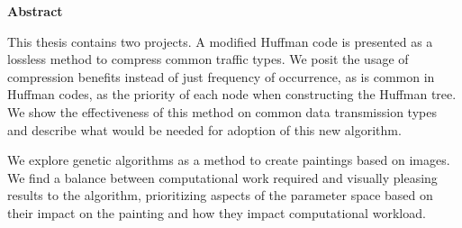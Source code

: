 %
%

\begin{center}

\bigskip

\begin{Large}
\textbf{\theTitle}
\end{Large}

\bigskip

\begin{large}
\theAuthor
\end{large}

\bigskip
\bigskip

\textbf{Abstract}

\end{center}

\noindent
This thesis contains two projects. A modified Huffman code is presented as a lossless method to compress common traffic types. We posit the usage of compression benefits instead of just frequency of occurrence, as is common in Huffman codes, as the priority of each node when constructing the Huffman tree. We show the effectiveness of this method on common data transmission types and describe what would be needed for adoption of this new algorithm. 

We explore genetic algorithms as a method to create paintings based on images. We find a balance between computational work required and visually pleasing results to the algorithm, prioritizing aspects of the parameter space based on their impact on the painting and how they impact computational workload. 

